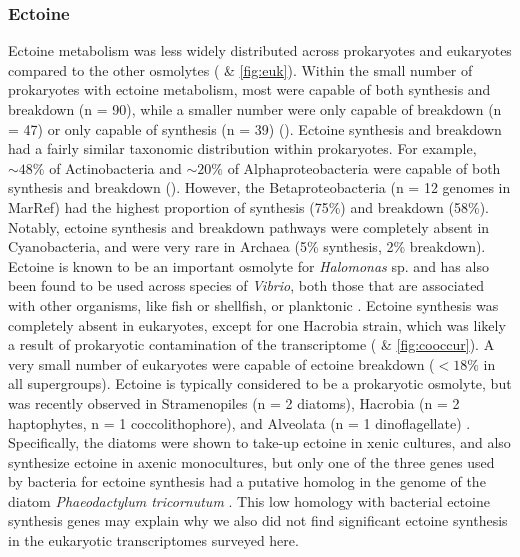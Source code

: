 \documentclass[utf8]{frontiersSCNS} %
\begin{document}
\subsubsection*{Ectoine}
Ectoine metabolism was less widely distributed across prokaryotes and eukaryotes compared to the other osmolytes ( \& \ref{fig:euk}). Within the small number of prokaryotes with ectoine metabolism, most were capable of both synthesis and breakdown (n = 90), while a smaller number were only capable of breakdown (n = 47) or only capable of synthesis (n = 39) (). Ectoine synthesis and breakdown had a fairly similar taxonomic distribution within prokaryotes. For example, $\sim 48\%$ of Actinobacteria and $\sim20\%$ of Alphaproteobacteria were capable of both synthesis and breakdown (). However, the Betaproteobacteria (n = 12 genomes in MarRef) had the highest proportion of synthesis (75\%) and breakdown (58\%). Notably, ectoine synthesis and breakdown pathways were completely absent in Cyanobacteria, and were very rare in Archaea (5\% synthesis, 2\% breakdown). Ectoine is known to be an important osmolyte for \emph{Halomonas} sp. \citep{Ono1999} and has also been found to be used across species of \emph{Vibrio}, both those that are associated with other organisms, like fish or shellfish, or planktonic \citep{Pflughoeft2003,Ongagna-Yhombi2013,Ma2017}. Ectoine synthesis was completely absent in eukaryotes, except for one Hacrobia strain, which was likely a result of prokaryotic contamination of the transcriptome ( \& \ref{fig:cooccur}). A very small number of eukaryotes were capable of ectoine breakdown ($< 18\%$ in all supergroups). Ectoine is typically considered to be a prokaryotic osmolyte, but was recently observed in Stramenopiles (n = 2 diatoms), Hacrobia (n = 2 haptophytes, n = 1 coccolithophore), and Alveolata (n = 1 dinoflagellate) \citep{Fenizia2020}. Specifically, the diatoms were shown to take-up ectoine in xenic cultures, and also synthesize ectoine in axenic monocultures, but only one of the three genes used by bacteria for ectoine synthesis had a putative homolog in the genome of the diatom \emph{Phaeodactylum tricornutum} \citep{Fenizia2020}. This low homology with bacterial ectoine synthesis genes may explain why we also did not find significant ectoine synthesis in the eukaryotic transcriptomes surveyed here.
\end{document}
